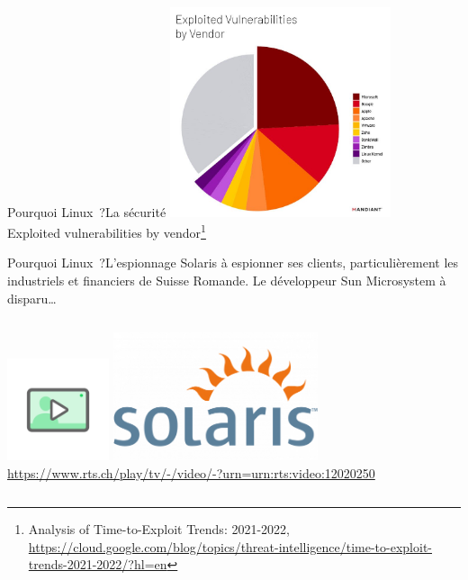 \documentclass{beamer}
\begin{document}
    \begin{frame}{Pourquoi Linux~?}{La sécurité}
        \centering
        \includegraphics[width=6.5cm]{image/vendors-vuln} \\ Exploited vulnerabilities by vendor\footnote{Analysis of Time-to-Exploit Trends: 2021-2022, \url{https://cloud.google.com/blog/topics/threat-intelligence/time-to-exploit-trends-2021-2022/?hl=en}} \\
    \end{frame}

    \begin{frame}{Pourquoi Linux~?}{L'espionnage}
        Solaris à espionner ses clients, particulièrement les industriels et financiers de Suisse Romande.
        Le développeur Sun Microsystem à disparu\ldots
        \bigbreak
        \begin{columns}
            \centering
            \includegraphics[width=3cm]{image/digicomp-video}
            \includegraphics[width=6cm]{image/Solaris-Logo-2005-500x313} \\ \url{https://www.rts.ch/play/tv/-/video/-?urn=urn:rts:video:12020250} \\
        \end{columns}
    \end{frame}
\end{document}
